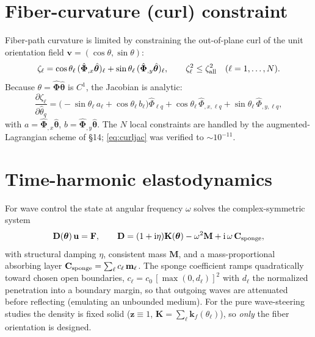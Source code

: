 \documentclass[11pt]{article}
\newcommand{\vth}{\bm{\theta}}
\newcommand{\vthh}{\hat{\bm{\theta}}}
\newcommand{\vz}{\mathbf{z}}
\newcommand{\vu}{\mathbf{u}}
\newcommand{\vF}{\mathbf{F}}
\newcommand{\vD}{\mathbf{D}}
\newcommand{\vK}{\mathbf{K}}
\newcommand{\vM}{\mathbf{M}}
\newcommand{\vC}{\mathbf{C}}
\newcommand{\vPhi}{\hat{\bm{\Phi}}}
\newcommand{\ii}{\mathrm{i}}
\begin{document}
\section{Fiber-curvature (curl) constraint}
Fiber-path curvature is limited by constraining the out-of-plane curl of the unit
orientation field $\mathbf v=(\cos\theta,\sin\theta)$:
\begin{equation}
  \zeta_\ell=\cos\theta_\ell\,(\vPhi_{,x}\vthh)_\ell
  +\sin\theta_\ell\,(\vPhi_{,y}\vthh)_\ell,\qquad
  \zeta_\ell^2\le\zeta_{\rm all}^2\quad(\ell=1,\dots,N).
  \label{eq:curl}
\end{equation}
Because $\theta=\vPhi\vthh$ is $C^1$, the Jacobian is analytic:
\begin{equation}
  \frac{\partial\zeta_\ell}{\partial\hat\theta_q}
  =\bigl(-\sin\theta_\ell\,a_\ell+\cos\theta_\ell\,b_\ell\bigr)\hat\Phi_{\ell q}
  +\cos\theta_\ell\,\hat\Phi_{,x,\ell q}+\sin\theta_\ell\,\hat\Phi_{,y,\ell q},
  \label{eq:curljac}
\end{equation}
with $a=\vPhi_{,x}\vthh$, $b=\vPhi_{,y}\vthh$. The $N$ local constraints are
handled by the augmented-Lagrangian scheme of \S14; \eqref{eq:curljac} was
verified to $\sim\!10^{-11}$.

\section{Time-harmonic elastodynamics}
For wave control the state at angular frequency $\omega$ solves the
complex-symmetric system
\begin{equation}
  \vD(\vth)\,\vu=\vF,\qquad
  \vD=(1+\ii\eta)\vK(\vth)-\omega^2\vM+\ii\,\omega\,\vC_{\rm sponge},
  \label{eq:D}
\end{equation}
with structural damping $\eta$, consistent mass $\vM$, and a mass-proportional
absorbing layer $\vC_{\rm sponge}=\sum_\ell c_\ell\,\mathbf{m}_\ell$. The
sponge coefficient ramps quadratically toward chosen open boundaries,
$c_\ell=c_0\,[\max(0,d_\ell)]^2$ with $d_\ell$ the normalized penetration into a
boundary margin, so that outgoing waves are attenuated before reflecting
(emulating an unbounded medium). For the pure wave-steering studies the density
is fixed solid ($\vz\equiv1$, $\vK=\sum_\ell\mathbf{k}_f(\theta_\ell)$), so
\emph{only} the fiber orientation is designed.
\end{document}
